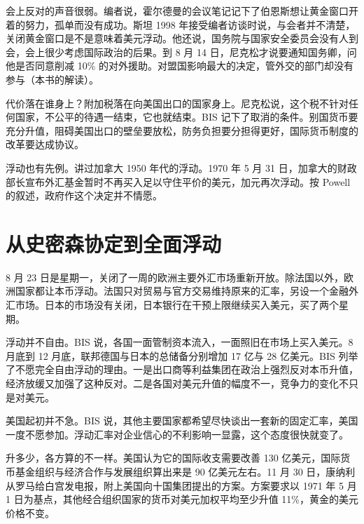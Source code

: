 会上反对的声音很弱。编者说，霍尔德曼的会议笔记记下了伯恩斯想让黄金窗口开着的努力，孤单而没有成功\cite{frus46a}。斯坦 1998 年接受编者访谈时说，与会者并不清楚，关闭黄金窗口是不是意味着美元浮动\cite{frus46a}。他还说，国务院与国家安全委员会没有人到会，会上很少考虑国际政治的后果\cite{frus46a}。到 8 月 14 日，尼克松才说要通知国务卿，问他是否同意削减 10\% 的对外援助\cite{frus46a}。对盟国影响最大的决定，管外交的部门却没有参与（本书的解读）。

代价落在谁身上？附加税落在向美国出口的国家身上。尼克松说，这个税不针对任何国家，不公平的待遇一结束，它也就结束\cite{nixon1971}。BIS 记下了取消的条件。别国货币要充分升值，阻碍美国出口的壁垒要放松，防务负担要分担得更好，国际货币制度的改革要达成协议\cite{bis1972}。

浮动也有先例。讲过加拿大 1950 年代的浮动。1970 年 5 月 31 日，加拿大的财政部长宣布外汇基金暂时不再买入足以守住平价的美元，加元再次浮动\cite{powell2005}。按 Powell 的叙述，政府作这个决定并不情愿\cite{powell2005}。

\section{从史密森协定到全面浮动}\label{sec:floating-smithsonian}

8 月 23 日是星期一，关闭了一周的欧洲主要外汇市场重新开放\cite{bis1972}。除法国以外，欧洲国家都让本币浮动\cite{bis1972}。法国只对贸易与官方交易维持原来的汇率，另设一个金融外汇市场\cite{bis1972}。日本的市场没有关闭，日本银行在干预上限继续买入美元，买了两个星期\cite{bis1972}。

浮动并不自由。BIS 说，各国一面管制资本流入，一面照旧在市场上买入美元\cite{bis1972}。8 月底到 12 月底，联邦德国与日本的总储备分别增加 17 亿与 28 亿美元\cite{bis1972}。BIS 列举了不愿完全自由浮动的理由。一是出口商等利益集团在政治上强烈反对本币升值，经济放缓又加强了这种反对\cite{bis1972}。二是各国对美元升值的幅度不一，竞争力的变化不只是对美元\cite{bis1972}。

美国起初并不急。BIS 说，其他主要国家都希望尽快谈出一套新的固定汇率，美国一度不愿参加\cite{bis1972}。浮动汇率对企业信心的不利影响一显露，这个态度很快就变了\cite{bis1972}。

升多少，各方算的不一样。美国认为它的国际收支需要改善 130 亿美元，国际货币基金组织与经济合作与发展组织算出来是 90 亿美元左右\cite{bis1972}。11 月 30 日，康纳利从罗马给白宫发电报，附上美国向十国集团提出的方案\cite{frus46a}。方案要求以 1971 年 5 月 1 日为基点，其他经合组织国家的货币对美元加权平均至少升值 11\%，黄金的美元价格不变\cite{frus46a}。

